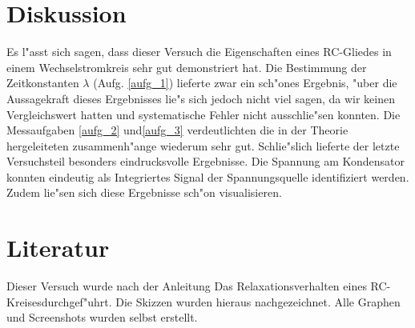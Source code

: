 \documentclass{scrartcl}
\begin{document}
	\section{Diskussion}

		Es l"asst sich sagen, dass dieser Versuch die Eigenschaften eines RC-Gliedes in einem Wechselstromkreis sehr gut demonstriert hat.
		Die Bestimmung der Zeitkonstanten $\lambda$ (Aufg. \ref{aufg_1}) lieferte zwar ein sch"ones Ergebnis,
		"uber die Aussagekraft dieses Ergebnisses lie"s sich jedoch nicht viel sagen,
		da wir keinen Vergleichswert hatten
		und systematische Fehler nicht ausschlie"sen konnten.
		Die Messaufgaben \ref{aufg_2} und\ref{aufg_3} verdeutlichten die in der Theorie hergeleiteten zusammenh"ange wiederum sehr gut.
		Schlie"slich lieferte der letzte Versuchsteil besonders eindrucksvolle Ergebnisse.
		Die Spannung am Kondensator konnten eindeutig als Integriertes Signal der Spannungsquelle identifiziert werden.
		Zudem lie"sen sich diese Ergebnisse sch"on visualisieren.

	\section{Literatur}

		Dieser Versuch wurde nach der Anleitung Das Relaxationsverhalten eines RC-Kreisesdurchgef"uhrt. Die Skizzen wurden hieraus nachgezeichnet.
		Alle Graphen und Screenshots wurden selbst erstellt. 
\end{document}
